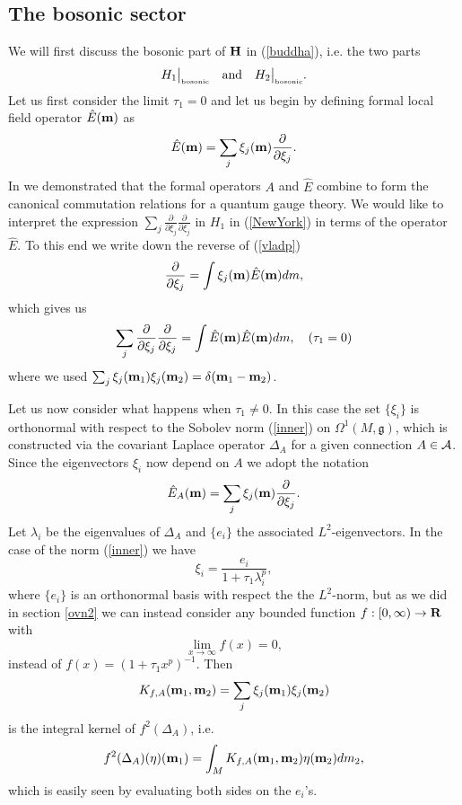 \documentclass[12pt]{article}
\def\OO{\Omega}
\def\ca{{\cal A}}
\newcommand{\R}{\operatorname{\bold R}}
\begin{document}
\subsection{The bosonic sector}

We will first discuss the bosonic part of ${\bf H}$ in (\ref{buddha}), i.e. the two parts
$$
H_1 \big\vert_{\mbox{\tiny bosonic}} \quad \mbox{and}\quad H_2 \big\vert_{\mbox{\tiny bosonic}}.
$$
Let us first consider the limit $\tau_1=0$ and let us begin by defining formal local field operator $\hat{E}({\bf m})$ as
\begin{equation}
    \hat{E} ({\bf m}) =\sum_j  \xi_j ({\bf m}) \frac{\partial }{\partial \xi_j} .
     \label{vladp}
\end{equation}
In \cite{Aastrup:2019yui} we demonstrated that the formal operators ${A}$ and $\hat{E}$ combine to form the canonical commutation relations for a quantum gauge theory. 
We would like to interpret the expression $\sum_j \frac{\partial}{\partial \xi_j} \frac{\partial}{\partial \xi_j}$ in $H_1$ in (\ref{NewYork}) in terms of the operator $\hat{E}$. To this end we write down the reverse of (\ref{vladp}) 
$$
\frac{\partial}{\partial \xi_j} = \int \xi_j({\bf m})\hat{E}({\bf m}) dm , 
$$
which gives us
\begin{equation} 
\sum_j \frac{\partial}{\partial \xi_j} \frac{\partial}{\partial \xi_j} = \int \hat{E}({\bf m}) \hat{E}({\bf m}) dm , \quad (\tau_1=0)
\label{philipglass}
\end{equation}
where we used $\sum_j \xi_j({\bf m}_1)\xi_j({\bf m}_2)=\delta ({\bf m}_1-{\bf m}_2)$. 






Let us now consider what happens when $\tau_1\not=0$. In this case the set $\{ \xi_i\}$ is orthonormal with respect to the Sobolev norm (\ref{inner}) on $\OO^1(M,\mathfrak{g})$, which is constructed via the covariant Laplace operator $\Delta_A$ for a given connection $A\in\ca$. 
Since the eigenvectors $\xi_i$ now depend on $A$ we adopt the notation
\begin{equation}
\hat{E}_A({\bf m})=\sum_j \xi_j({\bf m}) \frac{\partial }{\partial \xi_j} .
\label{skrig}
\end{equation}
Let $\lambda_i$ be the eigenvalues of $\Delta_A$ and $\{e_i\}$ the associated $L^2$-eigenvectors. In the case of the norm (\ref{inner}) we have 
$$
\xi_i=\frac{e_i}{1+\tau_1\lambda_i^p},
$$
where $\{e_i\}$ is an orthonormal basis with respect the the $L^2$-norm, 
but as we did in section \ref{ovn2} we can instead consider any bounded function $f:[0, \infty) \to \R$ with 
$$
\lim_{x\to \infty} f(x)=0,
$$ 
instead of $f(x)=(1+\tau_1x^p)^{-1}$. Then
\begin{equation}
 K_{f,A}({\bf m}_1,{\bf m}_2)= \sum_j \xi_j({\bf m}_1)\xi_j({\bf m}_2)
\label{Kairo}
\end{equation}
is the integral kernel of $f^2(\Delta_A)$, i.e. 
$$f^2(\Delta_A)(\eta)({\bf m}_1)=\int_M K_{f,A} ({\bf m}_1,{\bf m}_2)\eta({\bf m}_2) dm_2 ,$$
which is easily seen by evaluating both sides on the $e_i$'s. 
\end{document}
